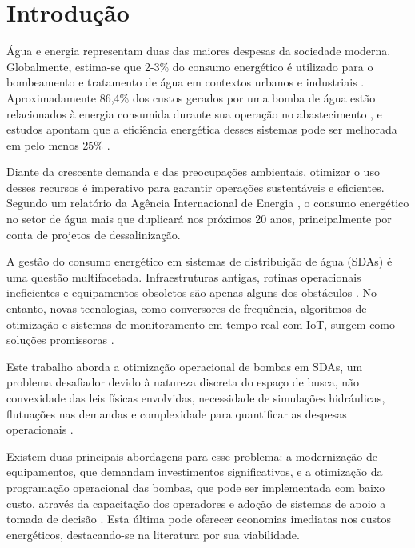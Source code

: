 \chapter{Introdução}
\label{cap:introducao}

Água e energia representam duas das maiores despesas da sociedade moderna. Globalmente, estima-se que 2-3\% do consumo energético é utilizado para o bombeamento e tratamento de água em contextos urbanos e industriais \cite{M2012}. Aproximadamente 86,4\% dos custos gerados por uma bomba de água estão relacionados à energia consumida durante sua operação no abastecimento \cite{Nault2015}, e estudos apontam que a eficiência energética desses sistemas pode ser melhorada em pelo menos 25\% \cite{Moreira2013}.

Diante da crescente demanda e das preocupações ambientais, otimizar o uso desses recursos é imperativo para garantir operações sustentáveis e eficientes. Segundo um relatório da Agência Internacional de Energia \cite{ieaWEO2016Special}, o consumo energético no setor de água mais que duplicará nos próximos 20 anos, principalmente por conta de projetos de dessalinização.

A gestão do consumo energético em sistemas de distribuição de água (SDAs) é uma questão multifacetada. Infraestruturas antigas, rotinas operacionais ineficientes e equipamentos obsoletos são apenas alguns dos obstáculos \cite{M2012, moura2010relaccao}. No entanto, novas tecnologias, como conversores de frequência, algoritmos de otimização e sistemas de monitoramento em tempo real com IoT, surgem como soluções promissoras \cite{Mackle1995, moura2010relaccao, ufopREPOSITORIOINSTITUCIONAL}.

Este trabalho aborda a otimização operacional de bombas em SDAs, um problema desafiador devido à natureza discreta do espaço de busca, não convexidade das leis físicas envolvidas, necessidade de simulações hidráulicas, flutuações nas demandas e complexidade para quantificar as despesas operacionais \cite{Makaremi2017}.

Existem duas principais abordagens para esse problema: a modernização de equipamentos, que demandam investimentos significativos, e a otimização da programação operacional das bombas, que pode ser implementada com baixo custo, através da capacitação dos operadores e adoção de sistemas de apoio a tomada de decisão \cite{Moreira2013}. Esta última pode oferecer economias imediatas nos custos energéticos, destacando-se na literatura por sua viabilidade.

